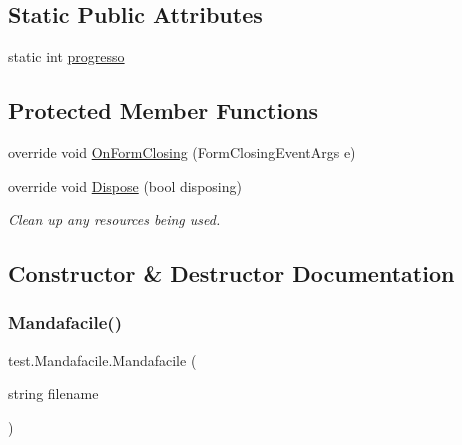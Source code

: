 \subsection*{Static Public Attributes}
\begin{DoxyCompactItemize}
\item 
static int \hyperlink{classtest_1_1_mandafacile_a4d8929c95a52053a2030f202bb48bb13}{progresso}
\end{DoxyCompactItemize}
\subsection*{Protected Member Functions}
\begin{DoxyCompactItemize}
\item 
override void \hyperlink{classtest_1_1_mandafacile_adaa5bade251e88e549f071ddae20c1d1}{On\+Form\+Closing} (Form\+Closing\+Event\+Args e)
\item 
override void \hyperlink{classtest_1_1_mandafacile_a902a7c1596e3482c4835dbdce757abe2}{Dispose} (bool disposing)
\begin{DoxyCompactList}\small\item\em Clean up any resources being used. \end{DoxyCompactList}\end{DoxyCompactItemize}


\subsection{Constructor \& Destructor Documentation}
\mbox{\label{classtest_1_1_mandafacile_a4de0d94073e5e8b0cdb9d70fbe86ec9d}} 
\subsubsection{\texorpdfstring{Mandafacile()}{Mandafacile()}\hspace{0.1cm}{\footnotesize\ttfamily [1/2]}}
{\footnotesize\ttfamily test.\+Mandafacile.\+Mandafacile (\begin{DoxyParamCaption}\item[{string}]{filename }\end{DoxyParamCaption})}

\mbox{\label{classtest_1_1_mandafacile_ac93bfc355fea31d877ad72aca5d4f510}} 
